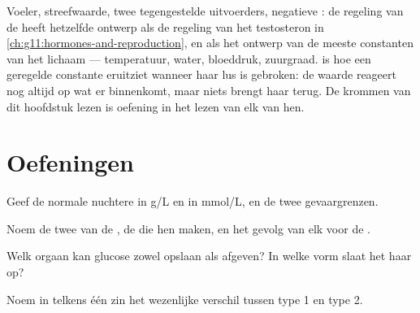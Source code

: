 \begin{remark}\label{rem:g12:glucose-and-diabetes:model}
Voeler, streefwaarde, twee tegengestelde uitvoerders, negatieve
: de regeling van de  heeft hetzelfde ontwerp als
de regeling van het testosteron in
\cref{ch:g11:hormones-and-reproduction}, en als het ontwerp van de meeste
constanten van het lichaam --- temperatuur, water, bloeddruk, zuurgraad.
 is hoe een geregelde constante eruitziet wanneer haar lus is
gebroken: de waarde reageert nog altijd op wat er binnenkomt, maar niets
brengt haar terug. De krommen van dit hoofdstuk lezen is oefening in het
lezen van elk van hen.
\end{remark}

\section{Oefeningen}

\begin{exercise}[$\star$]\label{exo:g12:glucose-and-diabetes:1}
Geef de normale nuchtere  in \unit{g/L} en in
\unit{mmol/L}, en de twee gevaargrenzen.
\end{exercise}

\begin{exercise}[$\star$]\label{exo:g12:glucose-and-diabetes:2}
Noem de twee  van de , de  die hen maken, en het
gevolg van elk voor de .
\end{exercise}

\begin{exercise}[$\star$]\label{exo:g12:glucose-and-diabetes:3}
Welk orgaan kan glucose zowel opslaan als afgeven? In welke vorm slaat het
haar op?
\end{exercise}

\begin{exercise}[$\star$]\label{exo:g12:glucose-and-diabetes:4}
Noem in telkens één zin het wezenlijke verschil tussen  type 1 en
type 2.
\end{exercise}

